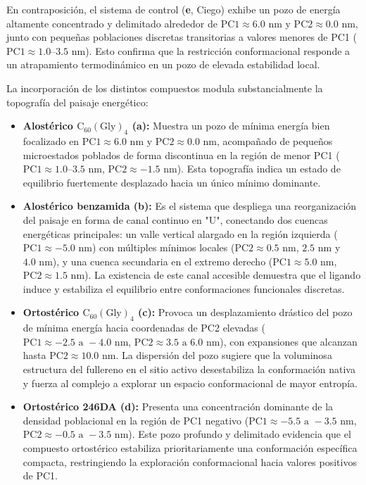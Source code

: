 En contraposición, el sistema de control (\textbf{e}, Ciego) exhibe un pozo de energía altamente concentrado y delimitado alrededor de $\text{PC1} \approx 6.0\text{ nm}$ y $\text{PC2} \approx 0.0\text{ nm}$, junto con pequeñas poblaciones discretas transitorias a valores menores de PC1 ($\text{PC1} \approx 1.0\text{--}3.5\text{ nm}$). Esto confirma que la restricción conformacional responde a un atrapamiento termodinámico en un pozo de elevada estabilidad local.

La incorporación de los distintos compuestos modula substancialmente la topografía del paisaje energético:

\begin{itemize}
    \item \textbf{Alostérico $\text{C}_{60}(\text{Gly})_4$ (a):} Muestra un pozo de mínima energía bien focalizado en $\text{PC1} \approx 6.0\text{ nm}$ y $\text{PC2} \approx 0.0\text{ nm}$, acompañado de pequeños microestados poblados de forma discontinua en la región de menor PC1 ($\text{PC1} \approx 1.0\text{--}3.5\text{ nm}$, $\text{PC2} \approx -1.5\text{ nm}$). Esta topografía indica un estado de equilibrio fuertemente desplazado hacia un único mínimo dominante.
    
    \item \textbf{Alostérico benzamida (b):} Es el sistema que despliega una reorganización del paisaje en forma de canal continuo en "U", conectando dos cuencas energéticas principales: un valle vertical alargado en la región izquierda ($\text{PC1} \approx -5.0\text{ nm}$) con múltiples mínimos locales ($\text{PC2} \approx 0.5\text{ nm}$, $2.5\text{ nm}$ y $4.0\text{ nm}$), y una cuenca secundaria en el extremo derecho ($\text{PC1} \approx 5.0\text{ nm}$, $\text{PC2} \approx 1.5\text{ nm}$). La existencia de este canal accesible demuestra que el ligando induce y estabiliza el equilibrio entre conformaciones funcionales discretas.
    
    \item \textbf{Ortostérico $\text{C}_{60}(\text{Gly})_4$ (c):} Provoca un desplazamiento drástico del pozo de mínima energía hacia coordenadas de PC2 elevadas ($\text{PC1} \approx -2.5\text{ a }-4.0\text{ nm}$, $\text{PC2} \approx 3.5\text{ a }6.0\text{ nm}$), con expansiones que alcanzan hasta $\text{PC2} \approx 10.0\text{ nm}$. La dispersión del pozo sugiere que la voluminosa estructura del fullereno en el sitio activo desestabiliza la conformación nativa y fuerza al complejo a explorar un espacio conformacional de mayor entropía.
    
    \item \textbf{Ortostérico 246DA (d):} Presenta una concentración dominante de la densidad poblacional en la región de PC1 negativo ($\text{PC1} \approx -5.5\text{ a }-3.5\text{ nm}$, $\text{PC2} \approx -0.5\text{ a }-3.5\text{ nm}$). Este pozo profundo y delimitado evidencia que el compuesto ortostérico estabiliza prioritariamente una conformación específica compacta, restringiendo la exploración conformacional hacia valores positivos de PC1.
\end{itemize}




